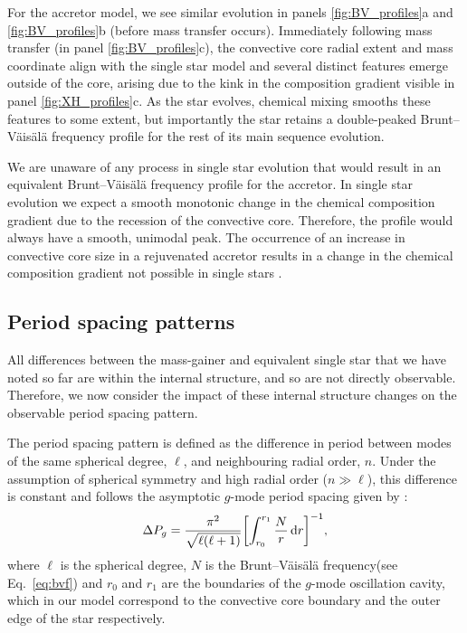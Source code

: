 \documentclass[twocolumn, twocolappendix, oneside]{aastex631}
\newcommand{\bvf}{Brunt–Väisälä frequency\xspace}
\newcommand{\gmode}{$g$-mode\xspace}
\begin{document}
For the accretor model, we see similar evolution in panels \ref{fig:BV_profiles}a and \ref{fig:BV_profiles}b (before mass transfer occurs). Immediately following mass transfer (in panel \ref{fig:BV_profiles}c), the convective core radial extent and mass coordinate align with the single star model and several distinct features emerge outside of the core, arising due to the kink in the composition gradient visible in panel \ref{fig:XH_profiles}c. As the star evolves, chemical mixing smooths these features to some extent, but importantly the star retains a double-peaked \bvf profile for the rest of its main sequence evolution.

We are unaware of any process in single star evolution that would result in an equivalent \bvf profile for the accretor. In single star evolution we expect a smooth monotonic change in the chemical composition gradient due to the recession of the convective core. Therefore, the profile would always have a smooth, unimodal peak. The occurrence of an increase in convective core size in a rejuvenated accretor results in a change in the chemical composition gradient not possible in single stars \citep{Renzo+2023}.

\subsection{Period spacing patterns}\label{sec:period_spacing}

All differences between the mass-gainer and equivalent single star that we have noted so far are within the internal structure, and so are not directly observable. Therefore, we now consider the impact of these internal structure changes on the observable period spacing pattern.

The period spacing pattern is defined as the difference in period between modes of the same spherical degree, $\ell$, and neighbouring radial order, $n$. Under the assumption of spherical symmetry and high radial order ($n \gg \ell$), this difference is constant and follows the asymptotic \gmode period spacing given by \citet{Tassoul+1980}:
\begin{equation}\label{eq:period-spacing}
    \Delta P_g = \frac{\pi^2}{\sqrt{\ell(\ell+1)}} \qty[\int_{r_0}^{r_1} \frac{N}{r} \dd{r}]^{-1},
\end{equation}
where $\ell$ is the spherical degree, $N$ is the \bvf (see Eq.~\ref{eq:bvf}) and $r_0$ and $r_1$ are the boundaries of the \gmode oscillation cavity, which in our model correspond to the convective core boundary and the outer edge of the star respectively.
\end{document}
